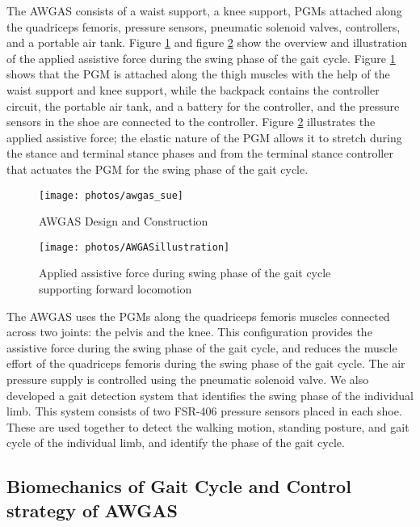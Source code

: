 \documentclass[paper,JRM,paper]{jaciiiarticle}
\begin{document}
The AWGAS consists of a waist support, a knee support, PGMs attached along the quadriceps femoris, pressure sensors, pneumatic solenoid valves, controllers, and a portable air tank. Figure \ref{fig:aws} and figure \ref{fig:awgasillustration} show the overview and illustration of the applied assistive force during the swing phase of the gait cycle. Figure \ref{fig:aws} shows that the PGM is attached along the thigh muscles with the help of the waist support and knee support, while the backpack contains the controller circuit, the portable air tank, and a battery for the controller, and the pressure sensors in the shoe are connected to the controller. Figure \ref{fig:awgasillustration} illustrates the applied assistive force; the elastic nature of the PGM allows it to stretch during the stance and terminal stance phases and from the terminal stance controller that actuates the PGM for the swing phase of the gait cycle.
 

\begin{figure}[h]
	\centering
	\texttt{[image: photos/awgas\_sue]}
	\caption{AWGAS Design and Construction}
	\label{fig:aws}
\end{figure}
\begin{figure}[h]
	\centering
	\texttt{[image: photos/AWGASillustration]}
	\caption{Applied assistive force during swing phase of the gait cycle supporting forward locomotion}
	\label{fig:awgasillustration}
\end{figure}


The AWGAS uses the PGMs along the quadriceps femoris muscles connected across two joints: the pelvis and the knee. This configuration provides the assistive force during the swing phase of the gait cycle, and reduces the muscle effort of the quadriceps femoris during the swing phase of the gait cycle. The air pressure supply is controlled using the pneumatic solenoid valve. We also developed a gait detection system that identifies the swing phase of the individual limb. This system consists of two FSR-406 pressure sensors placed in each shoe. These are used together to detect the walking motion, standing posture, and gait cycle of the individual limb, and identify the phase of the gait cycle.

\subsection{Biomechanics of Gait Cycle and Control strategy of AWGAS}
\end{document}
